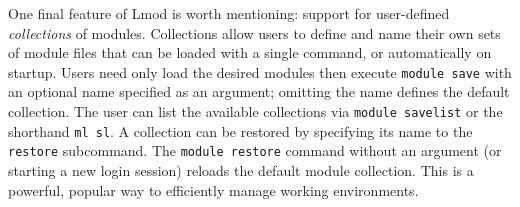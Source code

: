 One final feature of Lmod is worth mentioning: support for user-defined
\emph{collections} of modules. Collections allow users to define and name their
own sets of module files that can be loaded with a single command, or automatically on startup. Users need only load
the desired modules then execute
\texttt{\small module save} with an optional name specified as an argument; omitting the name
defines the default collection. The user can list the available collections
via \texttt{\small module savelist} or the shorthand
\texttt{\small ml sl}. A collection can be restored by specifying its name to the
\texttt{\small restore} subcommand. The \texttt{\small module restore} command without an argument (or starting a 
new login session) reloads the default module collection.
This is a powerful, popular way to efficiently manage working environments.



%

